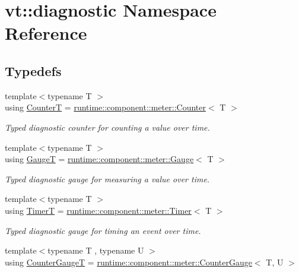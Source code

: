 \hypertarget{namespacevt_1_1diagnostic}{}\section{vt\+:\+:diagnostic Namespace Reference}
\label{namespacevt_1_1diagnostic}
\subsection*{Typedefs}
\begin{DoxyCompactItemize}
\item 
{\footnotesize template$<$typename T $>$ }\\using \hyperlink{namespacevt_1_1diagnostic_a34a84a0f18c25d9e30de69b4b6621ee2}{CounterT} = \hyperlink{structvt_1_1runtime_1_1component_1_1meter_1_1_counter}{runtime\+::component\+::meter\+::\+Counter}$<$ T $>$
\begin{DoxyCompactList}\small\item\em Typed diagnostic counter for counting a value over time. \end{DoxyCompactList}\item 
{\footnotesize template$<$typename T $>$ }\\using \hyperlink{namespacevt_1_1diagnostic_ae6ef3ff71955fc319093c29ddf2700d1}{GaugeT} = \hyperlink{structvt_1_1runtime_1_1component_1_1meter_1_1_gauge}{runtime\+::component\+::meter\+::\+Gauge}$<$ T $>$
\begin{DoxyCompactList}\small\item\em Typed diagnostic gauge for measuring a value over time. \end{DoxyCompactList}\item 
{\footnotesize template$<$typename T $>$ }\\using \hyperlink{namespacevt_1_1diagnostic_a02535ac129513fc0ee0f68f85130b9aa}{TimerT} = \hyperlink{structvt_1_1runtime_1_1component_1_1meter_1_1_timer}{runtime\+::component\+::meter\+::\+Timer}$<$ T $>$
\begin{DoxyCompactList}\small\item\em Typed diagnostic gauge for timing an event over time. \end{DoxyCompactList}\item 
{\footnotesize template$<$typename T , typename U $>$ }\\using \hyperlink{namespacevt_1_1diagnostic_a34a1d8c9a19453bb6b043e3371b7da22}{Counter\+GaugeT} = \hyperlink{structvt_1_1runtime_1_1component_1_1meter_1_1_counter_gauge}{runtime\+::component\+::meter\+::\+Counter\+Gauge}$<$ T, U $>$

\end{DoxyCompactItemize}
